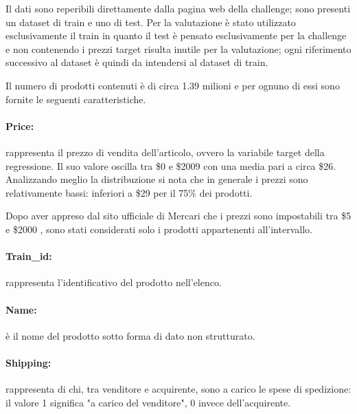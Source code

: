 
Il dati sono reperibili direttamente dalla pagina web della challenge; sono
presenti un dataset di train e uno di test. Per la valutazione è stato utilizzato
esclusivamente il train in quanto il test è pensato esclusivamente per la
challenge e non contenendo i prezzi target risulta inutile per la valutazione;
ogni riferimento successivo al dataset è quindi da intendersi al dataset di train.

Il numero di prodotti contenuti è di circa 1.39 milioni e per ognuno di essi
sono fornite le seguenti caratteristiche.

\paragraph{Price:} rappresenta il prezzo di vendita dell'articolo, ovvero la
variabile target della regressione. Il suo valore oscilla tra \$0 e \$2009 con
una media pari a circa \$26.
Analizzando meglio la distribuzione si nota che in generale i prezzi sono
relativamente bassi: inferiori a \$29 per il 75\% dei prodotti.

Dopo aver appreso dal sito ufficiale di Mercari che i prezzi sono impostabili
tra \$5 e \$2000 \cite{mercari-how-to-set-a-price}, sono stati considerati solo
i prodotti appartenenti all'intervallo.

\paragraph{Train\_id:} rappresenta l'identificativo del prodotto nell'elenco.

\paragraph{Name:} è il nome del prodotto sotto forma di dato non strutturato.

\paragraph{Shipping:} rappresenta di chi, tra venditore e acquirente, sono a
carico le spese di spedizione: il valore 1 significa "a carico del
venditore", 0 invece dell'acquirente.

